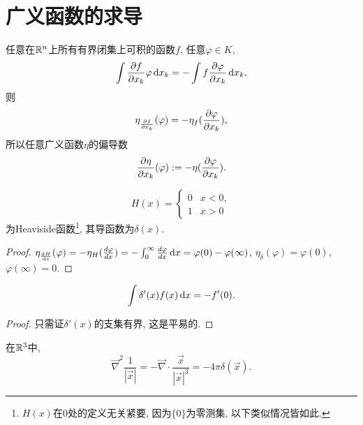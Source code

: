 \chapter{广义函数的求导}

任意在$\mathbb{R}^n$上所有有界闭集上可积的函数$f$, 任意$\varphi\in K$,
\begin{equation}
    \int\frac{\partial f}{\partial x_k}\varphi\,\mathrm{d} x_k=-\int f\frac{\partial \varphi}{\partial x_k}\,\mathrm{d} x_k, 
\end{equation}
则
\begin{equation}
    \eta_{\frac{\partial f}{\partial x_k}}(\varphi)=-\eta_f(\frac{\partial \varphi}{\partial x_k}), 
\end{equation}
所以任意广义函数$\eta$的偏导数
\begin{equation}
    \frac{\partial \eta}{\partial x_k}(\varphi):=-\eta(\frac{\partial \varphi}{\partial x_k}).
\end{equation}
\begin{theorem}
    \begin{equation}
        H(x)=\begin{cases}
            0&x<0,\\
            1&x>0
        \end{cases}
    \end{equation}
    为Heaviside函数\footnote{$H(x)$在$0$处的定义无关紧要, 因为$\{0\}$为零测集, 以下类似情况皆如此.}, 其导函数为$\delta(x)$.
\end{theorem}
\begin{proof}
    $\eta_{\frac{\mathrm{d} H}{\mathrm{d} x}}(\varphi)=-\eta_H(\frac{d \varphi}{d x})=-\int_0^\infty\frac{d \varphi}{d x}\,\mathrm{d} x=\varphi(0)-\varphi(\infty)$, $\eta_{\delta}(\varphi)=\varphi(0)$, $\varphi(\infty)=0$.
\end{proof}
\begin{theorem}
    \begin{equation}
        \int \delta'(x)f(x)\,\mathrm{d} x=-f'(0).
    \end{equation}
\end{theorem}
\begin{proof}
    只需证$\delta'(x)$的支集有界, 这是平易的.
\end{proof}
\begin{theorem} 在$\mathbb{R}^3$中,
    \begin{equation}
        \vec{\nabla}^2\frac{1}{\left\lvert \vec{x}\right\rvert }=-\vec{\nabla}\cdot\frac{\vec{x}}{\left\lvert \vec{x}\right\rvert^3 }=-4\pi\delta(\vec{x}).
    \end{equation}
\end{theorem}
